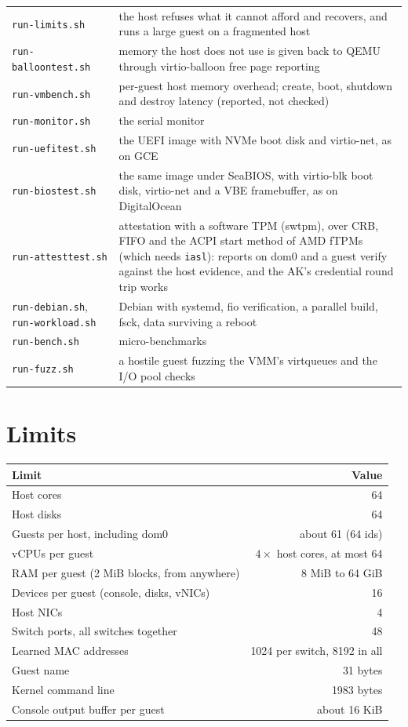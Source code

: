 \documentclass[11pt,a4paper]{report}
\newcommand{\cmd}[1]{\texttt{#1}}
\begin{document}
\begin{longtable}{@{}>{\raggedright\arraybackslash}p{5.6cm}>{\raggedright\arraybackslash}p{8.9cm}@{}}
\cmd{run-limits.sh} & the host refuses what it cannot afford and recovers,
  and runs a large guest on a fragmented host \\
\cmd{run-balloontest.sh} & memory the host does not use is given back to
  QEMU through virtio-balloon free page reporting \\
\cmd{run-vmbench.sh} & per-guest host memory overhead; create, boot,
  shutdown and destroy latency (reported, not checked) \\
\cmd{run-monitor.sh} & the serial monitor \\
\cmd{run-uefitest.sh} & the UEFI image with NVMe boot disk and virtio-net,
  as on GCE \\
\cmd{run-biostest.sh} & the same image under SeaBIOS, with virtio-blk boot
  disk, virtio-net and a VBE framebuffer, as on DigitalOcean \\
\cmd{run-attesttest.sh} & attestation with a software TPM (swtpm), over
  CRB, FIFO and the ACPI start method of AMD fTPMs (which needs
  \cmd{iasl}): reports on dom0 and a guest verify against the host
  evidence, and the AK's credential round trip works \\
\cmd{run-debian.sh}, \cmd{run-workload.sh} & Debian with systemd, fio
  verification, a parallel build, fsck, data surviving a reboot \\
\cmd{run-bench.sh} & micro-benchmarks \\
\cmd{run-fuzz.sh} & a hostile guest fuzzing the VMM's virtqueues and the
  I/O pool checks \\
\bottomrule
\end{longtable}
\endgroup

\appendix
\chapter{Limits}

\begin{longtable}{@{}lr@{}}
\toprule
Limit & Value \\
\midrule
Host cores & 64 \\
Host disks & 64 \\
Guests per host, including dom0 & about 61 (64 ids) \\
vCPUs per guest & $4\times$ host cores, at most 64 \\
RAM per guest (2 MiB blocks, from anywhere) & 8 MiB to 64 GiB \\
Devices per guest (console, disks, vNICs) & 16 \\
Host NICs & 4 \\
Switch ports, all switches together & 48 \\
Learned MAC addresses & 1024 per switch, 8192 in all \\
Guest name & 31 bytes \\
Kernel command line & 1983 bytes \\
Console output buffer per guest & about 16 KiB \\
\bottomrule
\end{longtable}
\end{document}
